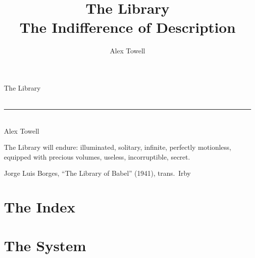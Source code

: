 \documentclass[11pt,twoside]{book}
\title{The Library\\[0.3em]\large The Indifference of Description}
\author{Alex Towell}
\date{}
\begin{document}
\frontmatter
\begin{titlepage}
\thispagestyle{empty}
\centering
{}
{\fontsize{34}{38}\selectfont The Library}\\[1.1em]
{\large\scshape{}}\\[1.9em]
\rule{1.5in}{0.4pt}\\[1.9em]
{\large Alex Towell}\par
{}
\end{titlepage}




\cleardoublepage
\thispagestyle{empty}
\epigraph{The Library will endure: illuminated, solitary, infinite, perfectly motionless, equipped with precious volumes, useless, incorruptible, secret.}{Jorge Luis Borges, ``The Library of Babel'' (1941), trans.\ Irby}

\tableofcontents




\mainmatter


\part{The Index}







\part{The System}






\end{document}
